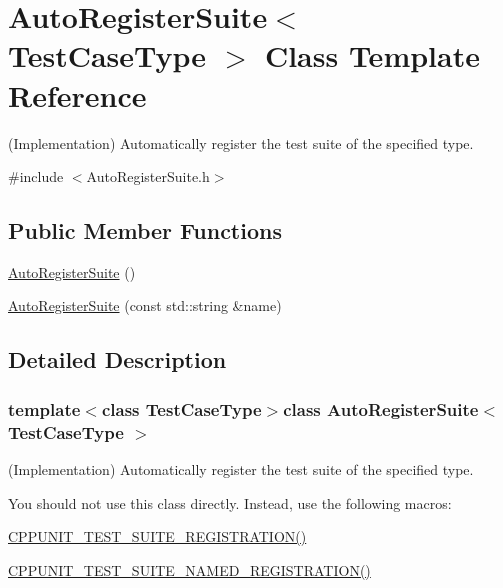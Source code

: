 \hypertarget{class_auto_register_suite}{\section{Auto\-Register\-Suite$<$ Test\-Case\-Type $>$ Class Template Reference}
\label{class_auto_register_suite}
}


(Implementation) Automatically register the test suite of the specified type.  




{\ttfamily \#include $<$Auto\-Register\-Suite.\-h$>$}

\subsection*{Public Member Functions}
\begin{DoxyCompactItemize}
\item 
\hyperlink{class_auto_register_suite_a4c02d0d6e3de726f67b875dc5615e22a}{Auto\-Register\-Suite} ()
\item 
\hyperlink{class_auto_register_suite_a9350fa1995545aad03b61b7a6db690e4}{Auto\-Register\-Suite} (const std\-::string \&name)
\end{DoxyCompactItemize}


\subsection{Detailed Description}
\subsubsection*{template$<$class Test\-Case\-Type$>$class Auto\-Register\-Suite$<$ Test\-Case\-Type $>$}

(Implementation) Automatically register the test suite of the specified type. 

You should not use this class directly. Instead, use the following macros\-:
\begin{DoxyItemize}
\item \hyperlink{_helper_macros_8h_a2f4071eec88d1e306665ada0f2dd80e4}{C\-P\-P\-U\-N\-I\-T\-\_\-\-T\-E\-S\-T\-\_\-\-S\-U\-I\-T\-E\-\_\-\-R\-E\-G\-I\-S\-T\-R\-A\-T\-I\-O\-N()}
\item \hyperlink{_helper_macros_8h_a028a5855a40ad3836e2a26aa48cd4c91}{C\-P\-P\-U\-N\-I\-T\-\_\-\-T\-E\-S\-T\-\_\-\-S\-U\-I\-T\-E\-\_\-\-N\-A\-M\-E\-D\-\_\-\-R\-E\-G\-I\-S\-T\-R\-A\-T\-I\-O\-N()}
\end{DoxyItemize}

